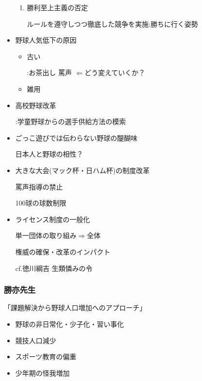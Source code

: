 \documentclass[dvipdfmx, 10.5pt]{jsarticle}
\begin{document}
\begin{itemize}
\begin{enumerate}
      \item 勝利至上主義の否定

      ルールを遵守しつつ徹底した競争を実施:勝ちに行く姿勢

    \end{enumerate}

    \item 野球人気低下の原因

    \begin{itemize}
      \item 古い

      :お茶出し 罵声 $\Leftarrow$どう変えていくか？

      \item 雑用
    \end{itemize}

    \item 高校野球改革

    :学童野球からの選手供給方法の模索

    \item ごっこ遊びでは伝わらない野球の醍醐味

    日本人と野球の相性？

    \item 大きな大会(マック杯・日ハム杯)の制度改革

    罵声指導の禁止

    100球の球数制限

    \item ライセンス制度の一般化

    単一団体の取り組み$\Rightarrow$全体

    権威の確保・改革のインパクト

    cf.徳川綱吉 生類憐みの令

  \end{itemize}

\subsubsection{勝亦先生}

  「課題解決から野球人口増加へのアプローチ」

  \begin{itemize}
    \item 野球の非日常化・少子化・習い事化

    \item 競技人口減少

    \item スポーツ教育の偏重

    \item 少年期の怪我増加

  \end{itemize}
\end{document}
